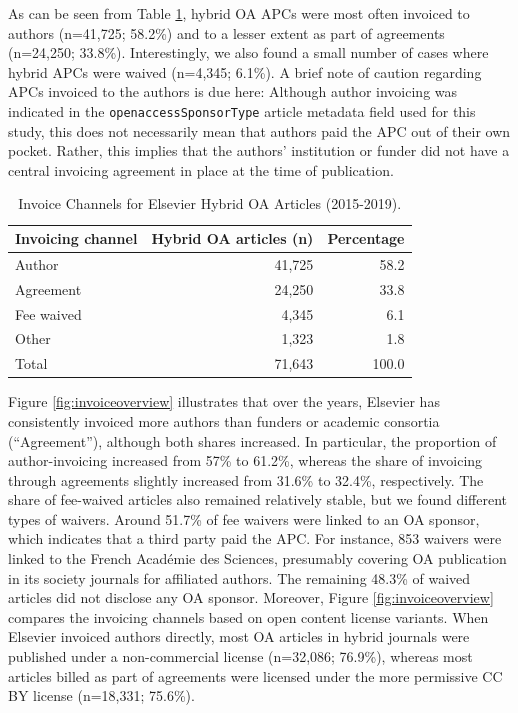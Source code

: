 \documentclass[a4paper,man,floatsintext,longtable,noextraspace,12pt]{apa6}
\begin{document}
As can be seen from Table \ref{tab:invoicing_overview}, hybrid OA APCs
were most often invoiced to authors (n=41,725; 58.2\%) and to a lesser
extent as part of agreements (n=24,250; 33.8\%). Interestingly, we also
found a small number of cases where hybrid APCs were waived (n=4,345;
6.1\%). A brief note of caution regarding APCs invoiced to the authors
is due here: Although author invoicing was indicated in the
\texttt{openaccessSponsorType} article metadata field used for this
study, this does not necessarily mean that authors paid the APC out of
their own pocket. Rather, this implies that the authors' institution or
funder did not have a central invoicing agreement in place at the time
of publication.

\begin{table}

\caption{\label{tab:invoicing_overview}Invoice Channels for Elsevier Hybrid OA Articles (2015-2019).}
\centering
\begin{tabular}[t]{lrr}
\toprule
Invoicing channel & Hybrid OA articles (n) & Percentage\\
\midrule
Author & 41,725 & 58.2\\
Agreement & 24,250 & 33.8\\
Fee waived & 4,345 & 6.1\\
Other & 1,323 & 1.8\\
\midrule
Total & 71,643 & 100.0\\
\bottomrule
\end{tabular}
\end{table}

Figure \ref{fig:invoiceoverview} illustrates that over the years,
Elsevier has consistently invoiced more authors than funders or academic
consortia (``Agreement''), although both shares increased. In
particular, the proportion of author-invoicing increased from 57\% to
61.2\%, whereas the share of invoicing through agreements slightly
increased from 31.6\% to 32.4\%, respectively. The share of fee-waived
articles also remained relatively stable, but we found different types
of waivers. Around 51.7\% of fee waivers were linked to an OA sponsor,
which indicates that a third party paid the APC. For instance, 853
waivers were linked to the French Académie des Sciences, presumably
covering OA publication in its society journals for affiliated authors.
The remaining 48.3\% of waived articles did not disclose any OA sponsor.
Moreover, Figure \ref{fig:invoiceoverview} compares the invoicing
channels based on open content license variants. When Elsevier invoiced
authors directly, most OA articles in hybrid journals were published
under a non-commercial license (n=32,086; 76.9\%), whereas most articles
billed as part of agreements were licensed under the more permissive CC
BY license (n=18,331; 75.6\%).
\end{document}
